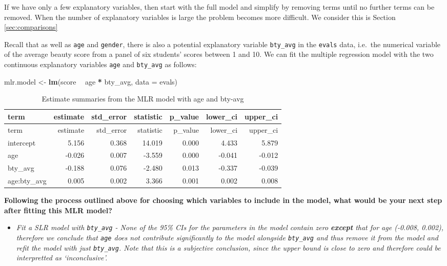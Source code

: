 \documentclass[]{article}
\newenvironment{Shaded}{\begin{snugshade}}{\end{snugshade}}
\newcommand{\KeywordTok}[1]{\textcolor[rgb]{0.13,0.29,0.53}{\textbf{#1}}}
\newcommand{\DataTypeTok}[1]{\textcolor[rgb]{0.13,0.29,0.53}{#1}}
\newcommand{\StringTok}[1]{\textcolor[rgb]{0.31,0.60,0.02}{#1}}
\newcommand{\OperatorTok}[1]{\textcolor[rgb]{0.81,0.36,0.00}{\textbf{#1}}}
\newcommand{\NormalTok}[1]{#1}
\providecommand{\tightlist}{%
  \setlength{\itemsep}{0pt}\setlength{\parskip}{0pt}}
\begin{document}
If we have only a few explanatory variables, then start with the full
model and simplify by removing terms until no further terms can be
removed. When the number of explanatory variables is large the problem
becomes more difficult. We consider this is Section
\ref{sec:comparisons}

Recall that as well as \texttt{age} and \texttt{gender}, there is also a
potential explanatory variable \texttt{bty\_avg} in the \texttt{evals}
data, i.e.~the numerical variable of the average beauty score from a
panel of six students' scores between 1 and 10. We can fit the multiple
regression model with the two continuous explanatory variables
\texttt{age} and \texttt{bty\_avg} as follows:

\begin{Shaded}
\begin{Highlighting}[]
\NormalTok{mlr.model <-}\StringTok{ }\KeywordTok{lm}\NormalTok{(score }\OperatorTok{~}\StringTok{ }\NormalTok{age }\OperatorTok{*}\StringTok{ }\NormalTok{bty_avg, }\DataTypeTok{data =}\NormalTok{ evals)}
\end{Highlighting}
\end{Shaded}

\begin{longtable}[]{@{}lrrrrrr@{}}
\caption{Estimate summaries from the MLR model with age and
bty-avg}\tabularnewline
\toprule
term & estimate & std\_error & statistic & p\_value & lower\_ci &
upper\_ci\tabularnewline
\midrule
\endfirsthead
\toprule
term & estimate & std\_error & statistic & p\_value & lower\_ci &
upper\_ci\tabularnewline
\midrule
\endhead
intercept & 5.156 & 0.368 & 14.019 & 0.000 & 4.433 &
5.879\tabularnewline
age & -0.026 & 0.007 & -3.559 & 0.000 & -0.041 & -0.012\tabularnewline
bty\_avg & -0.188 & 0.076 & -2.480 & 0.013 & -0.337 &
-0.039\tabularnewline
age:bty\_avg & 0.005 & 0.002 & 3.366 & 0.001 & 0.002 &
0.008\tabularnewline
\bottomrule
\end{longtable}

\textbf{Following the process outlined above for choosing which
variables to include in the model, what would be your next step after
fitting this MLR model?}

\begin{itemize}
\tightlist
\item
  \emph{Fit a SLR model with \texttt{bty\_avg} - None of the 95\% CIs
  for the parameters in the model contain zero \textbf{except} that for
  age (-0.008, 0.002), therefore we conclude that \texttt{age} does not
  contribute significantly to the model alongside \texttt{bty\_avg} and
  thus remove it from the model and refit the model with just
  \texttt{bty\_avg}. Note that this is a subjective conclusion, since
  the upper bound is close to zero and therefore could be interpretted
  as `inconclusive'.}
\end{itemize}
\end{document}
